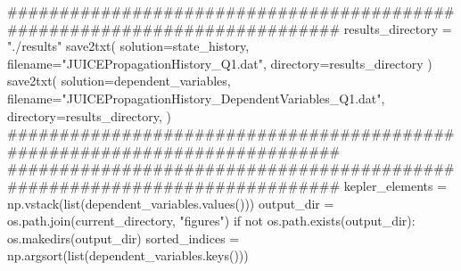 \markdownRendererInterblockSeparator
{}########################################################################### results_directory = "./results" save2txt( solution=state_history, filename="JUICEPropagationHistory_Q1.dat", directory=results_directory ) save2txt( solution=dependent_variables, filename="JUICEPropagationHistory_DependentVariables_Q1.dat", directory=results_directory, )\markdownRendererInterblockSeparator
{}###########################################################################\markdownRendererInterblockSeparator
{}
\markdownRendererSectionEnd \markdownRendererSectionBegin
{}\markdownRendererInterblockSeparator
{}###########################################################################\markdownRendererInterblockSeparator
{}
\markdownRendererSectionEnd \markdownRendererSectionBegin
{}\markdownRendererInterblockSeparator
{}kepler_elements = np.vstack(list(dependent_variables.values()))\markdownRendererInterblockSeparator
{}
\markdownRendererSectionEnd \markdownRendererSectionBegin
{}\markdownRendererInterblockSeparator
{}
\markdownRendererSectionEnd \markdownRendererSectionBegin
{}\markdownRendererInterblockSeparator
{}output_dir = os.path.join(current_directory, "figures") if not os.path.exists(output_dir): os.makedirs(output_dir)\markdownRendererInterblockSeparator
{}
\markdownRendererSectionEnd \markdownRendererSectionBegin
{}\markdownRendererInterblockSeparator
{}
\markdownRendererSectionEnd \markdownRendererSectionBegin
{}\markdownRendererInterblockSeparator
{}sorted_indices = np.argsort(list(dependent_variables.keys()))\markdownRendererInterblockSeparator
{}
\markdownRendererSectionEnd \markdownRendererSectionBegin
{}\markdownRendererInterblockSeparator
{}
\markdownRendererSectionEnd \markdownRendererSectionBegin
{}\markdownRendererInterblockSeparator
{}
\markdownRendererSectionEnd \markdownRendererSectionBegin
{}\markdownRendererInterblockSeparator

